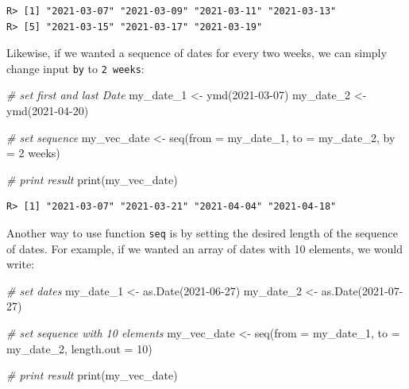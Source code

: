\documentclass[
  12pt,
]{book}
\newenvironment{Shaded}{\begin{snugshade}}{\end{snugshade}}
\newcommand{\AttributeTok}[1]{\textcolor[rgb]{0.61,0.61,0.61}{#1}}
\newcommand{\CommentTok}[1]{\textcolor[rgb]{0.37,0.37,0.37}{\textit{#1}}}
\newcommand{\DecValTok}[1]{\textcolor[rgb]{0.06,0.06,0.06}{#1}}
\newcommand{\FunctionTok}[1]{\textcolor[rgb]{0,0,0}{#1}}
\newcommand{\NormalTok}[1]{#1}
\newcommand{\OtherTok}[1]{\textcolor[rgb]{0.37,0.37,0.37}{#1}}
\newcommand{\StringTok}[1]{\textcolor[rgb]{0.5,0.5,0.5}{#1}}
\begin{document}
\begin{verbatim}
R> [1] "2021-03-07" "2021-03-09" "2021-03-11" "2021-03-13"
R> [5] "2021-03-15" "2021-03-17" "2021-03-19"
\end{verbatim}

Likewise, if we wanted a sequence of dates for every two weeks, we can simply change input \texttt{by} to \texttt{\textquotesingle{}2\ weeks\textquotesingle{}}:

\begin{Shaded}
\begin{Highlighting}[]
\CommentTok{\# set first and last Date}
\NormalTok{my\_date\_1 }\OtherTok{\textless{}{-}} \FunctionTok{ymd}\NormalTok{(}\StringTok{\textquotesingle{}2021{-}03{-}07\textquotesingle{}}\NormalTok{)}
\NormalTok{my\_date\_2 }\OtherTok{\textless{}{-}} \FunctionTok{ymd}\NormalTok{(}\StringTok{\textquotesingle{}2021{-}04{-}20\textquotesingle{}}\NormalTok{)}

\CommentTok{\# set sequence}
\NormalTok{my\_vec\_date }\OtherTok{\textless{}{-}} \FunctionTok{seq}\NormalTok{(}\AttributeTok{from =}\NormalTok{ my\_date\_1,}
                   \AttributeTok{to =}\NormalTok{ my\_date\_2,}
                   \AttributeTok{by =} \StringTok{\textquotesingle{}2 weeks\textquotesingle{}}\NormalTok{)}

\CommentTok{\# print result}
\FunctionTok{print}\NormalTok{(my\_vec\_date)}
\end{Highlighting}
\end{Shaded}

\begin{verbatim}
R> [1] "2021-03-07" "2021-03-21" "2021-04-04" "2021-04-18"
\end{verbatim}

Another way to use function \texttt{seq} is by setting the desired length of the sequence of dates. For example, if we wanted an array of dates with 10 elements, we would write:

\begin{Shaded}
\begin{Highlighting}[]
\CommentTok{\# set dates}
\NormalTok{my\_date\_1 }\OtherTok{\textless{}{-}} \FunctionTok{as.Date}\NormalTok{(}\StringTok{\textquotesingle{}2021{-}06{-}27\textquotesingle{}}\NormalTok{)}
\NormalTok{my\_date\_2 }\OtherTok{\textless{}{-}} \FunctionTok{as.Date}\NormalTok{(}\StringTok{\textquotesingle{}2021{-}07{-}27\textquotesingle{}}\NormalTok{)}

\CommentTok{\# set sequence with 10 elements}
\NormalTok{my\_vec\_date }\OtherTok{\textless{}{-}} \FunctionTok{seq}\NormalTok{(}\AttributeTok{from =}\NormalTok{ my\_date\_1,}
                   \AttributeTok{to =}\NormalTok{ my\_date\_2,}
                   \AttributeTok{length.out =} \DecValTok{10}\NormalTok{)}

\CommentTok{\# print result}
\FunctionTok{print}\NormalTok{(my\_vec\_date)}
\end{Highlighting}
\end{Shaded}
\end{document}
